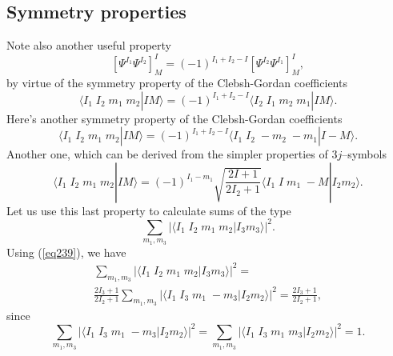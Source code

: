 \begin{subappendices}
\subsection{Symmetry properties}
Note also another useful property
\begin{equation}
\left[ \Psi^{I_1}\Psi^{I_2}\right]^{I}_M=(-1)^{I_1+I_2-I}\left[ \Psi^{I_2}\Psi^{I_1}\right]^{I}_M,
\end{equation}
by virtue of the symmetry property of the Clebsh-Gordan coefficients
\begin{equation}\label{eq59}
\langle I_1\; I_2 \; m_1\;m_2 | I M\rangle= (-1)^{I_1+I_2-I} \langle I_2\; I_1 \; m_2\;m_1 | I M\rangle.
\end{equation}
Here's another symmetry property of the Clebsh-Gordan coefficients
\begin{equation}\label{eq28}
\langle I_1\; I_2 \; m_1\;m_2 | I M\rangle= (-1)^{I_1+I_2-I} \langle I_1\; I_2 \; -m_2\;-m_1 | I -M\rangle.
\end{equation}
Another one, which can be derived from the simpler properties of $3j$--symbols
\begin{equation}\label{eq239}
\langle I_1\; I_2 \; m_1\;m_2 | I M\rangle= (-1)^{I_1-m_1}\sqrt{\frac{2I+1}{2I_2+1}} \langle I_1\; I \; m_1\;-M | I_2 m_2\rangle.
\end{equation}
Let us use this last property to calculate sums of the type
\begin{equation}\label{eq240}
\sum_{m_1,m_3}\left|\langle I_1\; I_2 \; m_1\;m_2 | I_3 m_3\rangle \right|^2.
\end{equation}
Using (\ref{eq239}), we have
\begin{multline}\label{eq241}
\sum_{m_1,m_3}\left|\langle I_1\; I_2 \; m_1\;m_2 | I_3 m_3\rangle \right|^2=\\
\frac{2I_3+1}{2I_2+1}\sum_{m_1,m_3}\left|\langle I_1\; I_3 \; m_1\;-m_3 | I_2 m_2\rangle \right|^2=
\frac{2I_3+1}{2I_2+1},
\end{multline}
since
\begin{equation}\label{eq242}
\sum_{m_1,m_3}\left|\langle I_1\; I_3 \; m_1\;-m_3 | I_2 m_2\rangle \right|^2=\sum_{m_1,m_3}\left|\langle I_1\; I_3 \; m_1\;m_3 | I_2 m_2\rangle \right|^2=1.
\end{equation}

\end{subappendices}
